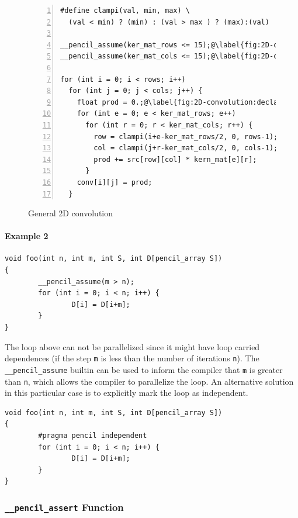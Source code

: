 \begin{figure}[t]
\begin{lstlisting}[stepnumber=1,numbers=left,numberstyle={\tiny\tt},numbersep=5pt,escapechar=@,language=pencil]
#define clampi(val, min, max) \
  (val < min) ? (min) : (val > max ) ? (max):(val)

__pencil_assume(ker_mat_rows <= 15);@\label{fig:2D-convolution:assume1}@
__pencil_assume(ker_mat_cols <= 15);@\label{fig:2D-convolution:assume2}@

for (int i = 0; i < rows; i++)
  for (int j = 0; j < cols; j++) {
    float prod = 0.;@\label{fig:2D-convolution:declaration}@
    for (int e = 0; e < ker_mat_rows; e++)
      for (int r = 0; r < ker_mat_cols; r++) {
        row = clampi(i+e-ker_mat_rows/2, 0, rows-1);
        col = clampi(j+r-ker_mat_cols/2, 0, cols-1);
        prod += src[row][col] * kern_mat[e][r];
      }
    conv[i][j] = prod;
  }
\end{lstlisting}
\caption{General 2D convolution}
\label{fig:2D-convolution}
\vskip-0.5cm
\end{figure}
  
\paragraph{Example 2}
  \begin{lstlisting}[language=pencil]
void foo(int n, int m, int S, int D[pencil_array S])
{
        __pencil_assume(m > n);
        for (int i = 0; i < n; i++) {
                D[i] = D[i+m];
        }
}
  \end{lstlisting}
The loop above can not be parallelized since it might have loop
carried dependences (if the step \lstinline!m! is less than the
number of iterations \lstinline!n!).
The \lstinline!__pencil_assume! builtin can be used to inform the compiler that
\lstinline!m! is greater than \lstinline!n!, which allows the compiler
to parallelize the loop.
An alternative solution in this particular case is to explicitly
mark the loop as independent.

  \begin{lstlisting}[language=pencil]
void foo(int n, int m, int S, int D[pencil_array S])
{
        #pragma pencil independent
        for (int i = 0; i < n; i++) {
                D[i] = D[i+m];
        }
}
  \end{lstlisting}


\subsubsection{\texttt{\_\_pencil\_assert} Function}

